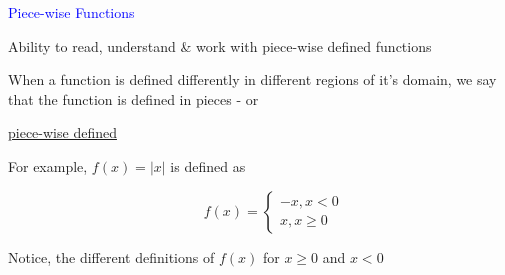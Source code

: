 \documentclass[14pt,fleqn]{extarticle}
\begin{document}
\begin{skill}
    \begin{narrow}
\textcolor{blue}{Piece-wise Functions}

Ability to read, understand \& work with piece-wise defined functions
         
    \end{narrow}
    
    \reason 

When a function is defined differently in
different regions of it's domain, we say
that the function is  defined in pieces - 
or 

\underline{piece-wise defined}\newline 

For example, $f(x) = \vert x\vert$ is defined as 

\[ \qquad f(x) = \begin{cases} 
-x, x < 0 \\
x, x\geq 0 
\end{cases} \]

Notice, the different definitions of $f(x)$ for 
$x\geq 0$ and $x <  0$
    
\end{skill}
\end{document}
